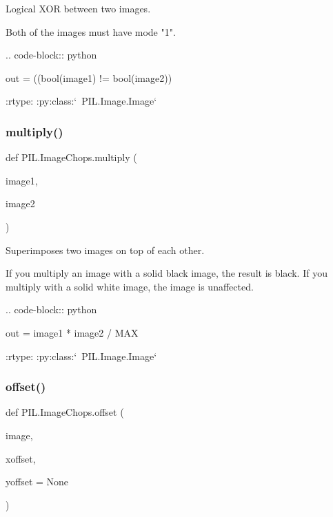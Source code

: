 \begin{DoxyVerb}Logical XOR between two images.

Both of the images must have mode "1".

.. code-block:: python

    out = ((bool(image1) != bool(image2)) %

:rtype: :py:class:`~PIL.Image.Image`
\end{DoxyVerb}
 \mbox{\label{namespacePIL_1_1ImageChops_ab78375930238a5b4b79812ddbf604135}} 
\subsubsection{\texorpdfstring{multiply()}{multiply()}}
{\footnotesize\ttfamily def P\+I\+L.\+Image\+Chops.\+multiply (\begin{DoxyParamCaption}\item[{}]{image1,  }\item[{}]{image2 }\end{DoxyParamCaption})}

\begin{DoxyVerb}Superimposes two images on top of each other.

If you multiply an image with a solid black image, the result is black. If
you multiply with a solid white image, the image is unaffected.

.. code-block:: python

    out = image1 * image2 / MAX

:rtype: :py:class:`~PIL.Image.Image`
\end{DoxyVerb}
 \mbox{\label{namespacePIL_1_1ImageChops_aecb249ce586c43bfc14ac7ca6accad58}} 
\subsubsection{\texorpdfstring{offset()}{offset()}}
{\footnotesize\ttfamily def P\+I\+L.\+Image\+Chops.\+offset (\begin{DoxyParamCaption}\item[{}]{image,  }\item[{}]{xoffset,  }\item[{}]{yoffset = {\ttfamily None} }\end{DoxyParamCaption})}

